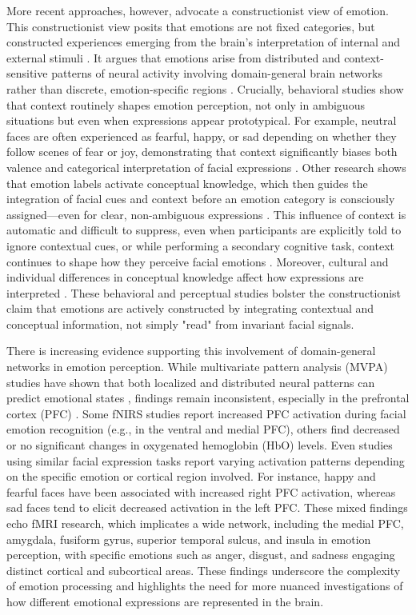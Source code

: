 More recent approaches, however, advocate a constructionist view of emotion. 
This constructionist view posits that emotions are not fixed categories, but constructed experiences emerging from the brain's interpretation of internal and external stimuli \citep{barrett_solving_2006}. 
It argues that emotions arise from distributed and context-sensitive patterns of neural activity involving domain-general brain networks rather than discrete, emotion-specific regions \citep{lindquist_brain_2012}.
Crucially, behavioral studies show that context routinely shapes emotion perception, not only in ambiguous situations but even when expressions appear prototypical. 
For example, neutral faces are often experienced as fearful, happy, or sad depending on whether they follow scenes of fear or joy, demonstrating that context significantly biases both valence and categorical interpretation of facial expressions \citep{calbi_how_2017}. 
Other research shows that emotion labels activate conceptual knowledge, which then guides the integration of facial cues and context before an emotion category is consciously assigned—even for clear, non-ambiguous expressions \citep{brooks_conceptual_2018}.
This influence of context is automatic and difficult to suppress, even when participants are explicitly told to ignore contextual cues, or while performing a secondary cognitive task, context continues to shape how they perceive facial emotions \citep{aviezer_automaticity_2011}. 
Moreover, cultural and individual differences in conceptual knowledge affect how expressions are interpreted \citep{lee_context_2012}. 
These behavioral and perceptual studies bolster the constructionist claim that emotions are actively constructed by integrating contextual and conceptual information, not simply "read" from invariant facial signals. 

There is increasing evidence supporting this involvement of domain-general networks in emotion perception. 
While multivariate pattern analysis (MVPA) studies have shown that both localized and distributed neural patterns can predict emotional states \citep{kragel_decoding_2016}, findings remain inconsistent, especially in the prefrontal cortex (PFC) \citep{westgarth_systematic_2021, bendall_brief_2016}.
Some fNIRS studies report increased PFC activation during facial emotion recognition (e.g., in the ventral and medial PFC), others find decreased or no significant changes in oxygenated hemoglobin (HbO) levels.
Even studies using similar facial expression tasks report varying activation patterns depending on the specific emotion or cortical region involved. 
For instance, happy and fearful faces have been associated with increased right PFC activation, whereas sad faces tend to elicit decreased activation in the left PFC. 
These mixed findings echo fMRI research, which implicates a wide network, including the medial PFC, amygdala, fusiform gyrus, superior temporal sulcus, and insula in emotion perception, with specific emotions such as anger, disgust, and sadness engaging distinct cortical and subcortical areas. 
These findings underscore the complexity of emotion processing and highlights the need for more nuanced investigations of how different emotional expressions are represented in the brain.

